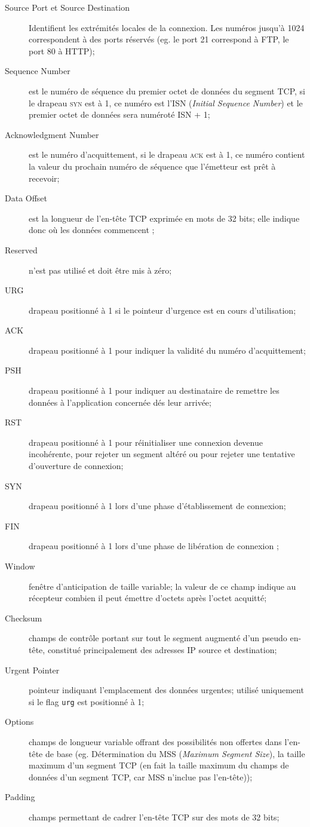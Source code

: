 \documentclass[11pt,english,french]{scrreprt}
\theoremstyle{remark}
\theoremstyle{definition}
\begin{document}
\begin{description}
	\item [Source Port et Source Destination] Identifient les extrémités locales de la connexion. Les numéros jusqu'à 1024 correspondent à des ports réservés (eg. le port 21 correspond à FTP, le port 80 à HTTP);
	\item [Sequence Number] est le numéro de séquence du premier octet de données du segment TCP, si le drapeau \textsc{syn} est à 1, ce numéro est l'ISN (\emph{Initial Sequence Number}) et le premier octet de données sera numéroté ISN + 1;
	\item [Acknowledgment Number] est le numéro d'acquittement, si le drapeau \textsc{ack} est à 1, ce numéro contient la valeur du prochain numéro de séquence que l'émetteur est prêt à recevoir;
	\item [Data Offset] est la longueur de l'en-tête TCP exprimée en mots de 32 bits; elle indique donc où les données commencent ;
	\item [Reserved] n'est pas utilisé et doit être mis à zéro;
	\item [URG] drapeau positionné à 1 si le pointeur d'urgence est en cours d'utilisation;
	\item [ACK] drapeau positionné à 1 pour indiquer la validité du numéro d'acquittement;
	\item [PSH] drapeau positionné à 1 pour indiquer au destinataire de remettre les données à l'application concernée dés leur arrivée;
	\item [RST] drapeau positionné à 1 pour réinitialiser une connexion devenue incohérente, pour rejeter un segment altéré ou pour rejeter une tentative d'ouverture de connexion;
	\item [SYN] drapeau positionné à 1 lors d'une phase d'établissement de connexion;
	\item [FIN] drapeau positionné à 1 lors d'une phase de libération de connexion ;
	\item [Window] fenêtre d'anticipation de taille variable; la valeur de ce champ indique au récepteur combien il peut émettre d'octets après l'octet acquitté;
	\item [Checksum] champs de contrôle portant sur tout le segment augmenté d'un pseudo en-tête, constitué principalement des adresses IP source et destination;
	\item [Urgent Pointer] pointeur indiquant l'emplacement des données urgentes; utilisé uniquement si le flag \lstinline!urg! est positionné à 1;
	\item [Options] champs de longueur variable offrant des possibilités non offertes dans l'en-tête de base (eg. Détermination du MSS (\emph{Maximum Segment Size}), la taille maximum d'un segment TCP (en fait la taille maximum du champs de données d'un segment TCP, car MSS n'inclue pas l'en-tête));
	\item [Padding] champs permettant de cadrer l'en-tête TCP sur des mots de 32 bits;
\end {description}
\end{document}
